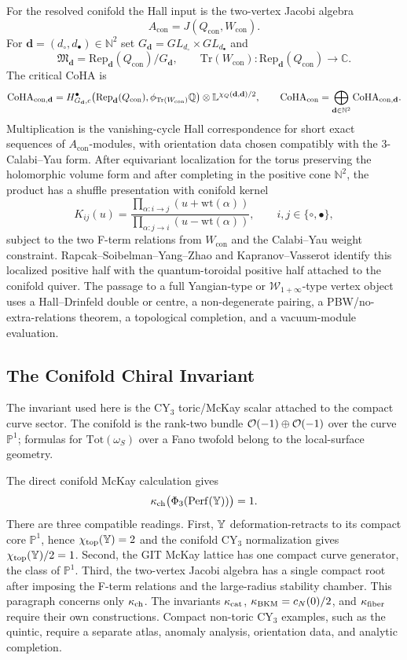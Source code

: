 For the resolved conifold the Hall input is the two-vertex Jacobi
algebra
\[
  A_{\mathrm{con}}=J(Q_{\mathrm{con}},W_{\mathrm{con}}).
\]
For $\mathbf d=(d_\circ,d_\bullet)\in\mathbb N^2$ set
$G_{\mathbf d}=GL_{d_\circ}\times GL_{d_\bullet}$ and
\[
  \mathfrak M_{\mathbf d}
  =
  \mathrm{Rep}_{\mathbf d}(Q_{\mathrm{con}})/G_{\mathbf d},
  \qquad
  \mathrm{Tr}(W_{\mathrm{con}}):
  \mathrm{Rep}_{\mathbf d}(Q_{\mathrm{con}})\to\mathbb C .
\]
The critical CoHA is
\[
  \mathrm{CoHA}_{\mathrm{con},\mathbf d}
  =
  H^{\bullet}_{G_{\mathbf d},c}
  \bigl(\mathrm{Rep}_{\mathbf d}(Q_{\mathrm{con}}),
  \phi_{\mathrm{Tr}(W_{\mathrm{con}})}\mathbb Q\bigr)
  \otimes \mathbb L^{\chi_Q(\mathbf d,\mathbf d)/2},
  \qquad
  \mathrm{CoHA}_{\mathrm{con}}=\bigoplus_{\mathbf d\in\mathbb N^2}
  \mathrm{CoHA}_{\mathrm{con},\mathbf d}.
\]
Multiplication is the vanishing-cycle Hall correspondence for short
exact sequences of $A_{\mathrm{con}}$-modules, with orientation data
chosen compatibly with the $3$-Calabi--Yau form. After equivariant
localization for the torus preserving the holomorphic volume form and
after completing in the positive cone $\mathbb N^2$, the product has a
shuffle presentation with conifold kernel
\[
  K_{ij}(u)=
  \frac{\prod_{\alpha:i\to j}(u+\mathrm{wt}(\alpha))}
       {\prod_{\alpha:j\to i}(u-\mathrm{wt}(\alpha))},
  \qquad i,j\in\{\circ,\bullet\},
\]
subject to the two F-term relations from $W_{\mathrm{con}}$ and the
Calabi--Yau weight constraint. Rapcak--Soibelman--Yang--Zhao and
Kapranov--Vasserot identify this localized positive half with the
quantum-toroidal positive half attached to the conifold quiver. The
passage to a full Yangian-type or $\mathcal W_{1+\infty}$-type vertex
object uses a Hall--Drinfeld double or centre, a non-degenerate pairing,
a PBW/no-extra-relations theorem, a topological completion, and a
vacuum-module evaluation.

\subsection*{The Conifold Chiral Invariant}

The invariant used here is the CY$_3$ toric/McKay scalar attached to
the compact curve sector. The conifold is the rank-two bundle
$\mathcal{O}(-1)\oplus\mathcal{O}(-1)$ over the curve $\mathbb P^1$; formulas for
$\mathrm{Tot}(\omega_S)$ over a Fano twofold belong to the local-surface
geometry.

The direct conifold McKay calculation gives
\[
  \kappa_{\mathrm{ch}}\bigl(\Phi_3(\mathrm{Perf}(\mathbb{Y}))\bigr)=1.
\]
There are three compatible readings. First, $\mathbb{Y}$ deformation-retracts
to its compact core $\mathbb P^1$, hence $\chi_{\mathrm{top}}(\mathbb{Y})=2$
and the conifold CY$_3$ normalization gives $\chi_{\mathrm{top}}(\mathbb{Y})/2
=1$. Second, the GIT McKay lattice has one compact curve generator,
the class of $\mathbb P^1$. Third, the two-vertex Jacobi algebra has a
single compact root after imposing the F-term relations and the
large-radius stability chamber. This paragraph concerns only $\kappa_{\mathrm{ch}}$.
The invariants $\kappa_{\mathrm{cat}}$, $\kappa_{\mathrm{BKM}}=c_N(0)/2$, and $\kappa_{\mathrm{fiber}}$ require their own
constructions.
Compact non-toric CY$_3$ examples, such as the quintic, require a
separate atlas, anomaly analysis, orientation data, and analytic
completion.

